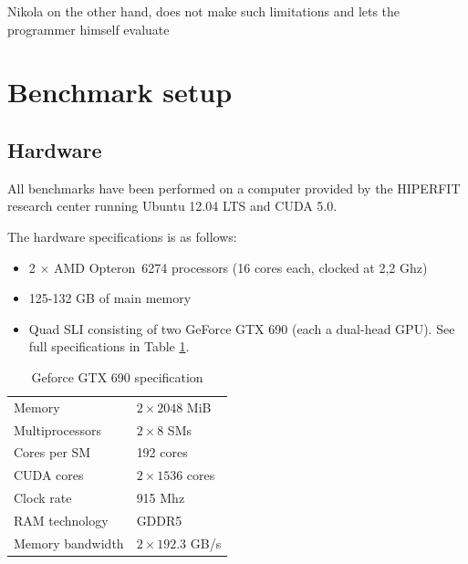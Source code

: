 Nikola on the other hand, does not make such limitations and lets the
programmer himself evaluate 

\section{Benchmark setup}

\subsection{Hardware}
All benchmarks have been performed on a computer provided by the
HIPERFIT research center running Ubuntu 12.04 LTS and CUDA 5.0.

The hardware specifications is as follows:

\begin{itemize}
\item 2 $\times$ AMD Opteron\texttrademark\ 6274 processors (16 cores each, clocked at 2,2 Ghz)
\item 125-132 GB of main memory 
\item Quad SLI consisting of two GeForce GTX 690 (each a dual-head GPU). See full specifications in Table \ref{tab:hardware}.
\end{itemize}

\begin{table}
  \centering
  \begin{tabular}{ll}
    Memory & $2 \times 2048$ MiB \\
    Multiprocessors & $2 \times 8$ SMs\\
    Cores per SM & 192 cores \\
    CUDA cores & $2 \times 1536$ cores\\
    Clock rate & 915 Mhz \\
    RAM technology & GDDR5 \\
    Memory bandwidth & $2 \times 192.3$ GB/s \\
    \hline
  \end{tabular}
  \caption{Geforce GTX 690 specification}
  \label{tab:hardware}
\end{table}


